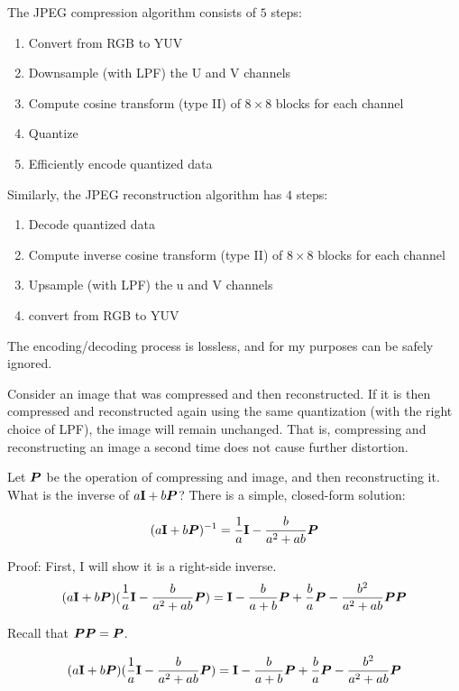 \documentclass{article}
\begin{document}
The JPEG compression algorithm consists of $5$ steps:
\begin{enumerate}
\item Convert from RGB to YUV
\item Downsample (with LPF) the U and V channels
\item Compute cosine transform (type II) of $8 \times 8$ blocks for each channel
\item Quantize
\item Efficiently encode quantized data
\end{enumerate}

Similarly, the JPEG reconstruction algorithm has $4$ steps:
\begin{enumerate}
\item Decode quantized data
\item Compute inverse cosine transform (type II) of $8 \times 8$ blocks for each channel
\item Upsample (with LPF) the u and V channels
\item convert from RGB to YUV
\end{enumerate}

The encoding/decoding process is lossless, and for my purposes can be safely ignored.

Consider an image that was compressed and then reconstructed. If it is then compressed and reconstructed again using the same quantization (with the right choice of LPF), the image will remain unchanged. That is, compressing and reconstructing an image a second time does not cause further distortion.

Let $\bm{P}$ be the operation of compressing and image, and then reconstructing it.  What is the inverse of $a{\bf I} + b\bm{P}$? There is a simple, closed-form solution:

\begin{equation}
(a{\bf I} + b\bm{P})^{-1} = \frac{1}{a}{\bf I} - \frac{b}{a^2 + ab}\bm{P}
\end{equation}

Proof:
First, I will show it is a right-side inverse.
\begin{equation}
(a{\bf I} + b\bm{P})(\frac{1}{a}{\bf I} - \frac{b}{a^2 + ab}\bm{P}) = {\bf I} - \frac{b}{a + b}\bm{P} + \frac{b}{a}\bm{P} - \frac{b^2}{a^2 + ab}\bm{P}\bm{P}
\end{equation}

Recall that $\bm{P}\bm{P} = \bm{P}$.

\begin{equation}
(a{\bf I} + b\bm{P})(\frac{1}{a}{\bf I} - \frac{b}{a^2 + ab}\bm{P}) = {\bf I}  - \frac{b}{a + b}\bm{P} + \frac{b}{a}\bm{P} - \frac{b^2}{a^2 + ab}\bm{P}
\end{equation}
\end{document}
